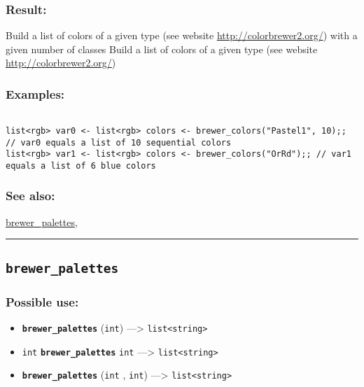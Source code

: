 \documentclass[]{book}
\providecommand{\tightlist}{%
  \setlength{\itemsep}{0pt}\setlength{\parskip}{0pt}}
\theoremstyle{definition}
\theoremstyle{definition}
\theoremstyle{definition}
\theoremstyle{remark}
\begin{document}
\subsubsection{Result:}\label{result-76}

Build a list of colors of a given type (see website
\url{http://colorbrewer2.org/}) with a given number of classes Build a
list of colors of a given type (see website
\url{http://colorbrewer2.org/})

\subsubsection{Examples:}\label{examples-59}

\begin{verbatim}
 
list<rgb> var0 <- list<rgb> colors <- brewer_colors("Pastel1", 10);; // var0 equals a list of 10 sequential colors 
list<rgb> var1 <- list<rgb> colors <- brewer_colors("OrRd");; // var1 equals a list of 6 blue colors
\end{verbatim}

\subsubsection{See also:}\label{see-also-48}

\href{operators-b-to-c.html\#brewer_palettes}{brewer\_palettes},

\begin{center}\rule{0.5\linewidth}{\linethickness}\end{center}

\subsection{\texorpdfstring{\texttt{brewer\_palettes}}{brewer\_palettes}}\label{brewer_palettes}

\subsubsection{Possible use:}\label{possible-use-78}

\begin{itemize}
\tightlist
\item
  \textbf{\texttt{brewer\_palettes}} (\texttt{int}) ---\textgreater{}
  \texttt{list\textless{}string\textgreater{}}
\item
  \texttt{int} \textbf{\texttt{brewer\_palettes}} \texttt{int}
  ---\textgreater{} \texttt{list\textless{}string\textgreater{}}
\item
  \textbf{\texttt{brewer\_palettes}} (\texttt{int} , \texttt{int})
  ---\textgreater{} \texttt{list\textless{}string\textgreater{}}
\end{itemize}
\end{document}

